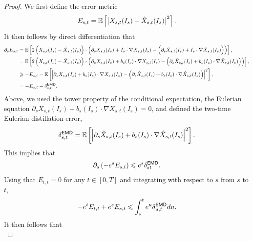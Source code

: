 \eulerianerr*
\begin{proof}
	We first define the error metric
	\begin{equation}
		E_{s, t} = \mathbb{E}\left[\big|X_{s, t}(I_s) - \hat{X}_{s, t}(I_s)\big|^2\right].
	\end{equation}
	It then follows by direct differentiation that
	\begin{equation}
		\begin{aligned}
			\partial_s E_{s, t} & = \mathbb{E}\left[2\left(X_{s, t}(I_s) - \hat{X}_{s, t}(I_s)\right)\cdot\left(\partial_s X_{s, t}(I_s) + \dot{I}_s\cdot\nabla X_{s, t}(I_s) - \left(\partial_s \hat{X}_{s, t}(I_s) + \dot{I}_s \cdot \nabla \hat{X}_{s, t}(I_s)\right)\right)\right], \\
			                    & = \mathbb{E}\left[2\left(X_{s, t}(I_s) - \hat{X}_{s, t}(I_s)\right)\cdot\left(\partial_s X_{s, t}(I_s) + b_s(I_s)\cdot\nabla X_{s, t}(I_s) - \left(\partial_s \hat{X}_{s, t}(I_s) + b_s(I_s) \cdot \nabla \hat{X}_{s, t}(I_s)\right)\right)\right],   \\
			                    & \geqslant -E_{s, t} - \mathbb{E}\left[\left|\partial_s X_{s, t}(I_s) + b_s(I_s)\cdot\nabla X_{s, t}(I_s) - \left(\partial_s \hat{X}_{s, t}(I_s) + b_s(I_s) \cdot \nabla \hat{X}_{s, t}(I_s)\right)\right|^2\right],                                        \\
			                    & = -E_{s, t} - \delta_{s, t}^{\mathsf{EMD}}.
			\nonumber
		\end{aligned}
	\end{equation}
	Above, we used the tower property of the conditional expectation, the Eulerian equation $\partial_s X_{s, t}(I_s) + b_s(I_s)\cdot\nabla X_{s, t}(I_s) = 0$, and defined the two-time Eulerian distillation error,
	\begin{equation}
		\delta_{s, t}^{\mathsf{EMD}} = \mathbb{E}\left[\left|\partial_s \hat{X}_{s, t}(I_s) + b_s(I_s) \cdot \nabla \hat{X}_{s, t}(I_s)\right|^2\right].
	\end{equation}
	This implies that
	\begin{equation}
		\partial_s \left(-e^{s}E_{s, t}\right) \leqslant e^{s}\delta_{s t}^{\mathsf{EMD}}.
	\end{equation}
	Using that $E_{t, t} = 0$ for any $t \in [0, T]$ and integrating with respect to $s$ from $s$ to $t$,
	\begin{equation}
		-e^{t}E_{t, t} + e^sE_{s, t} \leqslant \int_s^t e^{u}\delta_{u, t}^{\mathsf{EMD}}du.
	\end{equation}
	It then follows that
	\begin{equation}

\end{equation}
\end{proof}
